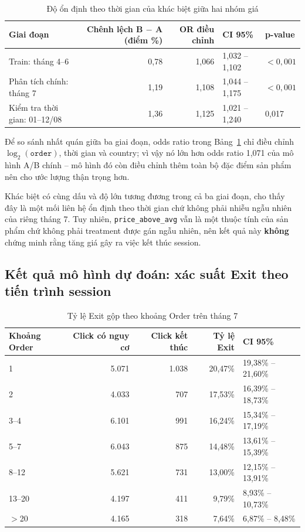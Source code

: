 \begin{table}[H]
\centering
\caption{Độ ổn định theo thời gian của khác biệt giữa hai nhóm giá}
\label{tab:ab-temporal}
\small
\begin{tabular}{lrrll}
\toprule
\textbf{Giai đoạn} & \textbf{Chênh lệch B $-$ A (điểm \%)}
& \textbf{OR điều chỉnh} & \textbf{CI 95\%} & \textbf{p-value} \\
\midrule
Train: tháng 4--6             & 0,78 & 1,066 & 1,032 -- 1,102 & $< 0{,}001$ \\
Phân tích chính: tháng 7      & 1,19 & 1,108 & 1,044 -- 1,175 & $< 0{,}001$ \\
Kiểm tra thời gian: 01--12/08 & 1,36 & 1,125 & 1,021 -- 1,240 & 0,017 \\
\bottomrule
\end{tabular}
\end{table}

Để so sánh nhất quán giữa ba giai đoạn, odds ratio trong
Bảng~\ref{tab:ab-temporal} chỉ điều chỉnh $\log_2(\texttt{order})$, thời gian và
country; vì vậy nó lớn hơn odds ratio 1,071 của mô hình A/B chính -- mô hình đó
còn điều chỉnh thêm toàn bộ đặc điểm sản phẩm nên cho ước lượng thận trọng hơn.

Khác biệt có cùng dấu và độ lớn tương đương trong cả ba giai đoạn, cho thấy đây
là một mối liên hệ ổn định theo thời gian chứ không phải nhiễu ngẫu nhiên của
riêng tháng 7. Tuy nhiên, \texttt{price\_above\_avg} vẫn là một thuộc tính của
sản phẩm chứ không phải treatment được gán ngẫu nhiên, nên kết quả này
\textbf{không} chứng minh rằng tăng giá gây ra việc kết thúc session.

\subsection{Kết quả mô hình dự đoán: xác suất Exit theo tiến trình session}

\begin{table}[H]
\centering
\caption{Tỷ lệ Exit gộp theo khoảng Order trên tháng 7}
\label{tab:hazard}
\small
\begin{tabular}{lrrrl}
\toprule
\textbf{Khoảng Order} & \textbf{Click có nguy cơ} & \textbf{Click kết thúc}
& \textbf{Tỷ lệ Exit} & \textbf{CI 95\%} \\
\midrule
1      & 5.071 & 1.038 & 20,47\% & 19,38\% -- 21,60\% \\
2      & 4.033 & 707   & 17,53\% & 16,39\% -- 18,73\% \\
3--4   & 6.101 & 991   & 16,24\% & 15,34\% -- 17,19\% \\
5--7   & 6.043 & 875   & 14,48\% & 13,61\% -- 15,39\% \\
8--12  & 5.621 & 731   & 13,00\% & 12,15\% -- 13,91\% \\
13--20 & 4.197 & 411   & 9,79\%  & 8,93\% -- 10,73\% \\
$>$20  & 4.165 & 318   & 7,64\%  & 6,87\% -- 8,48\% \\
\bottomrule
\end{tabular}
\end{table}

